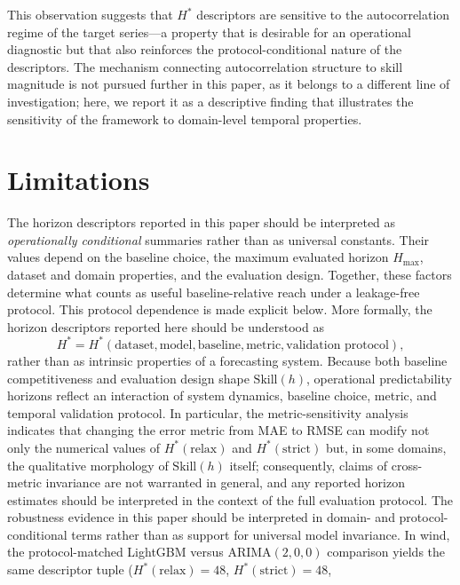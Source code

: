 \documentclass[pdflatex,sn-mathphys]{sn-jnl}
\begin{document}
This observation suggests that $H^*$ descriptors are sensitive to the autocorrelation regime of the target series—a property that is desirable for an operational diagnostic but that also reinforces the protocol-conditional nature of the descriptors. The mechanism connecting autocorrelation structure to skill magnitude is not pursued further in this paper, as it belongs to a different line of investigation; here, we report it as a descriptive finding that illustrates the sensitivity of the framework to domain-level temporal properties.

\section{Limitations}
The horizon descriptors reported in this paper should be interpreted as
\emph{operationally conditional} summaries rather than as universal
constants. Their values depend on the baseline choice, the maximum
evaluated horizon $H_{\max}$, dataset and domain properties, and the
evaluation design. Together, these factors determine what counts as
useful baseline-relative reach under a leakage-free protocol. This
protocol dependence is made explicit below.
More formally, the horizon descriptors reported here should be understood as
\[
H^* = H^*(\text{dataset}, \text{model}, \text{baseline}, \text{metric}, \text{validation protocol}),
\]
rather than as intrinsic properties of a forecasting system. Because both baseline competitiveness and evaluation design shape $\mathrm{Skill}(h)$, operational predictability horizons reflect an interaction of system dynamics, baseline choice, metric, and temporal validation protocol. In particular, the metric-sensitivity analysis indicates that changing the error metric from MAE to RMSE can modify not only the numerical values of $H^*(\mathrm{relax})$ and $H^*(\mathrm{strict})$ but, in some domains, the qualitative morphology of $\mathrm{Skill}(h)$ itself; consequently, claims of cross-metric invariance are not warranted in general, and any reported horizon estimates should be interpreted in the context of the full evaluation protocol.
The robustness evidence in this paper should be interpreted in domain-
and protocol-conditional terms rather than as support for universal model
invariance. In wind, the protocol-matched LightGBM versus ARIMA$(2,0,0)$
comparison yields the same descriptor tuple
($H^*(\mathrm{relax})=48$, $H^*(\mathrm{strict})=48$,
\end{document}
